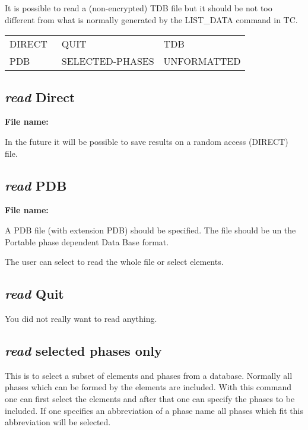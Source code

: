 \documentclass[11pt]{article}
\begin{document}
It is possible to read a (non-encrypted) TDB file but it should be not
too different from what is normally generated by the LIST\_DATA
command in TC.

\begin{tabular}{lll}
 DIRECT~        & QUIT~            & TDB\\
 PDB            & SELECTED-PHASES  & UNFORMATTED \\
\end{tabular}

\hypertarget{Read direct}{}
\subsection{{\em read} Direct}

{\bf File name:}

In the future it will be possible to save results on a random access
(DIRECT) file.

\hypertarget{Read PDB}{}
\subsection{{\em read} PDB}

{\bf File name:}

A PDB file (with extension PDB) should be specified.  The file
should be un the Portable phase dependent Data Base format.

The user can select to read the whole file or select elements.

\hypertarget{Read quit}{}
\subsection{{\em read} Quit}

You did not really want to read anything.

\hypertarget{Read select phase}{}
\subsection{{\em read} selected phases only}

This is to select a subset of elements and phases from a database.
Normally all phases which can be formed by the elements are included.
With this command one can first select the elements and after that one
can specify the phases to be included.  If one specifies an
abbreviation of a phase name all phases which fit this abbreviation
will be selected.
\end{document}
